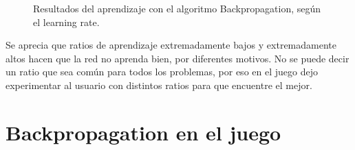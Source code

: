 \begin{figure}[ht]
	\caption{Resultados del aprendizaje con el algoritmo Backpropagation, según el learning rate.}
\end{figure}

Se aprecia que ratios de aprendizaje extremadamente bajos y extremadamente altos hacen que la red no aprenda bien, por diferentes motivos. No se puede decir un ratio que sea común para todos los problemas, por eso en el juego dejo experimentar al usuario con distintos ratios para que encuentre el mejor. 

\section{Backpropagation en el juego}
